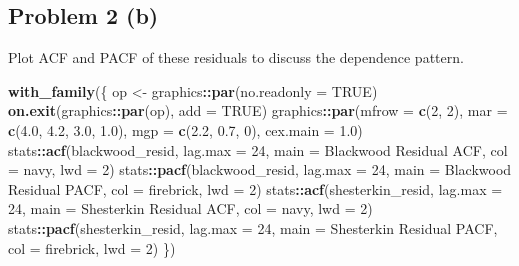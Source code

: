 \documentclass[
  10pt,
]{extarticle}
\newenvironment{Shaded}{\begin{snugshade}}{\end{snugshade}}
\newcommand{\AttributeTok}[1]{\textcolor[rgb]{0.13,0.29,0.53}{#1}}
\newcommand{\ConstantTok}[1]{\textcolor[rgb]{0.56,0.35,0.01}{#1}}
\newcommand{\DecValTok}[1]{\textcolor[rgb]{0.00,0.00,0.81}{#1}}
\newcommand{\FloatTok}[1]{\textcolor[rgb]{0.00,0.00,0.81}{#1}}
\newcommand{\FunctionTok}[1]{\textcolor[rgb]{0.13,0.29,0.53}{\textbf{#1}}}
\newcommand{\NormalTok}[1]{#1}
\newcommand{\OtherTok}[1]{\textcolor[rgb]{0.56,0.35,0.01}{#1}}
\newcommand{\SpecialCharTok}[1]{\textcolor[rgb]{0.81,0.36,0.00}{\textbf{#1}}}
\newcommand{\StringTok}[1]{\textcolor[rgb]{0.31,0.60,0.02}{#1}}
\begin{document}
\subsection{Problem 2 (b)}\label{problem-2-b}

\begin{problem}[Problem 2 (b)]
Plot ACF and PACF of these residuals to discuss the dependence pattern.
\end{problem}

\begin{Shaded}
\begin{Highlighting}[]
\FunctionTok{with\_family}\NormalTok{(\{}
\NormalTok{  op }\OtherTok{\textless{}{-}}\NormalTok{ graphics}\SpecialCharTok{::}\FunctionTok{par}\NormalTok{(}\AttributeTok{no.readonly =} \ConstantTok{TRUE}\NormalTok{)}
  \FunctionTok{on.exit}\NormalTok{(graphics}\SpecialCharTok{::}\FunctionTok{par}\NormalTok{(op), }\AttributeTok{add =} \ConstantTok{TRUE}\NormalTok{)}
\NormalTok{  graphics}\SpecialCharTok{::}\FunctionTok{par}\NormalTok{(}\AttributeTok{mfrow =} \FunctionTok{c}\NormalTok{(}\DecValTok{2}\NormalTok{, }\DecValTok{2}\NormalTok{), }\AttributeTok{mar =} \FunctionTok{c}\NormalTok{(}\FloatTok{4.0}\NormalTok{, }\FloatTok{4.2}\NormalTok{, }\FloatTok{3.0}\NormalTok{, }\FloatTok{1.0}\NormalTok{), }\AttributeTok{mgp =} \FunctionTok{c}\NormalTok{(}\FloatTok{2.2}\NormalTok{, }\FloatTok{0.7}\NormalTok{, }\DecValTok{0}\NormalTok{), }\AttributeTok{cex.main =} \FloatTok{1.0}\NormalTok{)}
\NormalTok{  stats}\SpecialCharTok{::}\FunctionTok{acf}\NormalTok{(blackwood\_resid, }\AttributeTok{lag.max =} \DecValTok{24}\NormalTok{, }\AttributeTok{main =} \StringTok{\textquotesingle{}Blackwood Residual ACF\textquotesingle{}}\NormalTok{, }\AttributeTok{col =} \StringTok{\textquotesingle{}navy\textquotesingle{}}\NormalTok{, }\AttributeTok{lwd =} \DecValTok{2}\NormalTok{)}
\NormalTok{  stats}\SpecialCharTok{::}\FunctionTok{pacf}\NormalTok{(blackwood\_resid, }\AttributeTok{lag.max =} \DecValTok{24}\NormalTok{, }\AttributeTok{main =} \StringTok{\textquotesingle{}Blackwood Residual PACF\textquotesingle{}}\NormalTok{, }\AttributeTok{col =} \StringTok{\textquotesingle{}firebrick\textquotesingle{}}\NormalTok{, }\AttributeTok{lwd =} \DecValTok{2}\NormalTok{)}
\NormalTok{  stats}\SpecialCharTok{::}\FunctionTok{acf}\NormalTok{(shesterkin\_resid, }\AttributeTok{lag.max =} \DecValTok{24}\NormalTok{, }\AttributeTok{main =} \StringTok{\textquotesingle{}Shesterkin Residual ACF\textquotesingle{}}\NormalTok{, }\AttributeTok{col =} \StringTok{\textquotesingle{}navy\textquotesingle{}}\NormalTok{, }\AttributeTok{lwd =} \DecValTok{2}\NormalTok{)}
\NormalTok{  stats}\SpecialCharTok{::}\FunctionTok{pacf}\NormalTok{(shesterkin\_resid, }\AttributeTok{lag.max =} \DecValTok{24}\NormalTok{, }\AttributeTok{main =} \StringTok{\textquotesingle{}Shesterkin Residual PACF\textquotesingle{}}\NormalTok{, }\AttributeTok{col =} \StringTok{\textquotesingle{}firebrick\textquotesingle{}}\NormalTok{, }\AttributeTok{lwd =} \DecValTok{2}\NormalTok{)}
\NormalTok{\})}
\end{Highlighting}
\end{Shaded}
\end{document}
